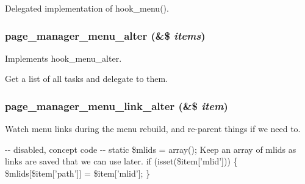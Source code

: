 \label{page__manager_8module_a64d2119bb7c032cf8d11b0431a7b4bc0}
Delegated implementation of hook\_\-menu(). \hypertarget{page__manager_8module_a16da3e1f83cf82d7d13d81847206f135}{
\subsubsection[{page\_\-manager\_\-menu\_\-alter}]{\setlength{\rightskip}{0pt plus 5cm}page\_\-manager\_\-menu\_\-alter (\&\$ {\em items})}}
\label{page__manager_8module_a16da3e1f83cf82d7d13d81847206f135}
Implements hook\_\-menu\_\-alter.

Get a list of all tasks and delegate to them. \hypertarget{page__manager_8module_a75d9dfb39efb8b79e8c5771cb288fb2c}{
\subsubsection[{page\_\-manager\_\-menu\_\-link\_\-alter}]{\setlength{\rightskip}{0pt plus 5cm}page\_\-manager\_\-menu\_\-link\_\-alter (\&\$ {\em item})}}
\label{page__manager_8module_a75d9dfb39efb8b79e8c5771cb288fb2c}
Watch menu links during the menu rebuild, and re-\/parent things if we need to. 

-\/-\/ disabled, concept code -\/-\/ static \$mlids = array(); Keep an array of mlids as links are saved that we can use later. if (isset(\$item\mbox{[}'mlid'\mbox{]})) \{ \$mlids\mbox{[}\$item\mbox{[}'path'\mbox{]}\mbox{]} = \$item\mbox{[}'mlid'\mbox{]}; \}

